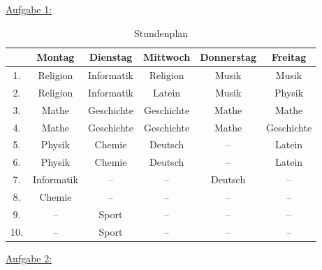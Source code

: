 \documentclass[12pt,a4paper]{article}
\begin{document}
    \setlength{\parindent}{0mm}
    \setcounter{tocdepth}{4}
    \pagestyle{empty}

    \underline{Aufgabe 1:}
    
    \begin{table}[h]
        \begin{tabular}[h]{|*{6}{c|}}
            \hline
            & Montag & Dienstag & Mittwoch & Donnerstag & Freitag \\
            \hline
            1. & Religion & Informatik & Religion & Musik & Musik \\
            \hline
            2. & Religion & Informatik & Latein & Musik & Physik \\
            \hline
            3. & Mathe & Geschichte & Geschichte & Mathe & Mathe \\
            \hline
            4. & Mathe & Geschichte & Geschichte & Mathe & Geschichte \\
            \hline
            5. & Physik & Chemie & Deutsch & -- & Latein \\
            \hline
            6. & Physik & Chemie & Deutsch & -- & Latein \\
            \hline
            7. & Informatik & -- & -- & Deutsch & -- \\
            \hline
            8. & Chemie & -- & -- & -- & -- \\
            \hline
            9. & -- & Sport & -- & -- & -- \\
            \hline
            10. & -- & Sport & -- & -- & -- \\
            \hline
        \end{tabular}

        \caption{Stundenplan}
        \label{tab:stundenplan}
    \end{table}

    \underline{Aufgabe 2:}
    
\end{document}
